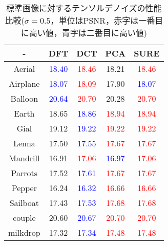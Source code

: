 \begin{table}[h]
\caption{標準画像に対するテンソルデノイズの性能比較($\sigma=0.5$，単位はPSNR，赤字は一番目に高い値，青字は二番目に高い値)}
\label{tab:settings}
\centering
\begin{tabular}{c||c|c|c||c}\hline
- & DFT & DCT & PCA & SURE\\\hline
Aerial &\textcolor{blue}{18.40}&	\textcolor{red}{18.46}&	18.21&	\textcolor{red}{18.46}\\\hline
Airplane &\textcolor{blue}{18.07}&\textcolor{red}{18.09}&	17.90&	\textcolor{blue}{18.07}\\\hline
Balloon &\textcolor{blue}{20.64}	&\textcolor{red}{20.70}&	20.28	&\textcolor{red}{20.70}\\\hline
Earth &18.65&	\textcolor{blue}{18.86}&	\textcolor{red}{18.94}&	\textcolor{red}{18.94}\\\hline
Gial&19.12&	\textcolor{blue}{19.22}&	\textcolor{red}{19.22}&	\textcolor{red}{19.22}\\\hline
Lenna &17.50&	\textcolor{blue}{17.55}&	\textcolor{red}{17.67}&	\textcolor{red}{17.67}\\\hline
Mandrill& 16.91&\textcolor{red}{17.06}&	\textcolor{blue}{16.97}	&\textcolor{red}{17.06}\\\hline
Parrots &17.52&	\textcolor{blue}{17.61}&	\textcolor{red}{17.67}	&\textcolor{red}{17.67}\\\hline
Pepper &16.24&	\textcolor{blue}{16.32}&	\textcolor{red}{16.66}&\textcolor{red}{16.66}\\\hline
Sailboat& 17.43	&\textcolor{blue}{17.53}	&\textcolor{red}{17.68}&	\textcolor{red}{17.68}\\\hline
couple &20.60&	\textcolor{blue}{20.67}&	\textcolor{red}{20.70}&	\textcolor{red}{20.70}\\\hline
milkdrop &17.32&	\textcolor{blue}{17.34}&	\textcolor{red}{17.48}	&\textcolor{red}{17.48}\\\hline
\end{tabular}
\end{table}